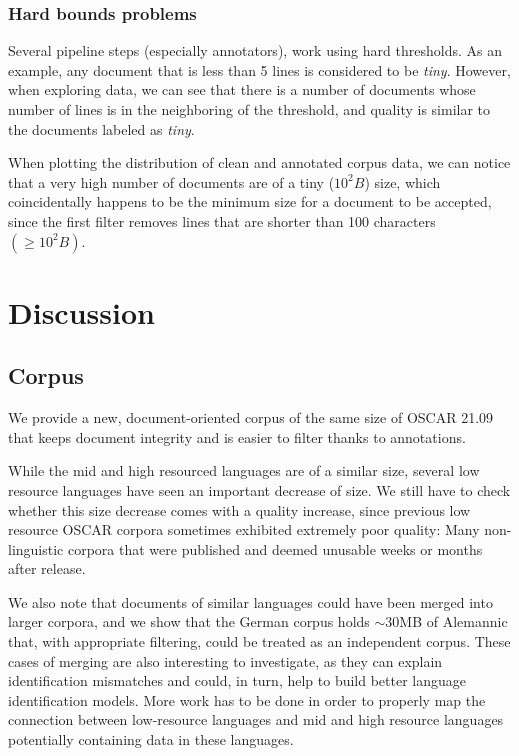 \subsubsection{Hard bounds problems}

Several pipeline steps (especially annotators), work using hard thresholds. As an example, any document that is less than 5 lines is considered to be \textit{tiny}. However, when exploring data, we can see that there is a number of documents whose number of lines is in the neighboring of the threshold, and quality is similar to the documents labeled as \textit{tiny}.

When plotting the distribution of clean and annotated corpus data, we can notice that a very high number of documents are of a tiny ($10^2 B$) size, which coincidentally happens to be the minimum size for a document to be accepted, since the first filter removes lines that are shorter than 100 characters $(\geq 10^2 B)$.


\section{Discussion}


\subsection{Corpus}
We provide a new, document-oriented corpus of the same size of OSCAR 21.09 that keeps document integrity and is easier to filter thanks to annotations.

While the mid and high resourced languages are of a similar size, several low resource languages have seen an important decrease of size.
We still have to check whether this size decrease comes with a quality increase, since previous low resource OSCAR corpora sometimes exhibited extremely poor quality: Many non-linguistic corpora that were published and deemed unusable weeks or months after release.

We also note that documents of similar languages could have been merged into larger corpora, and we show that the German corpus holds $\sim 30$MB of Alemannic that, with appropriate filtering, could be treated as an independent corpus. These cases of merging are also interesting to investigate, as they can explain identification mismatches and could, in turn, help to build better language identification models.
More work has to be done in order to properly map the connection between low-resource languages and mid and high resource languages potentially containing data in these languages.

